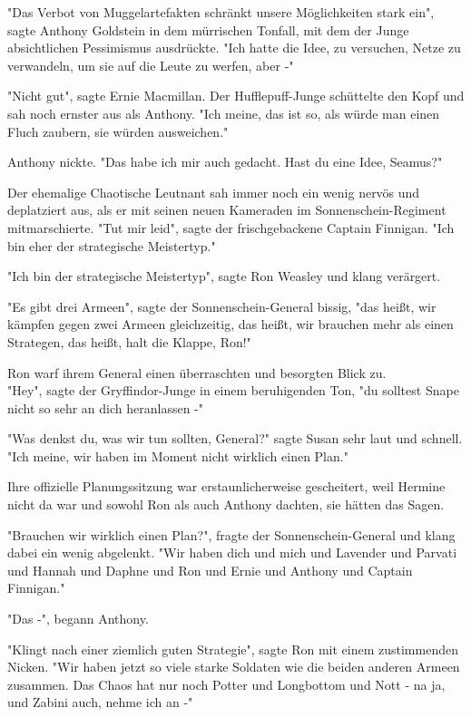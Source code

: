 {"Das Verbot von Muggelartefakten schränkt unsere Möglichkeiten stark ein", sagte Anthony Goldstein in dem mürrischen Tonfall, mit dem der Junge absichtlichen Pessimismus ausdrückte. "Ich hatte die Idee, zu versuchen, Netze zu verwandeln, um sie auf die Leute zu werfen, aber -"

"Nicht gut", sagte Ernie Macmillan. Der Hufflepuff-Junge schüttelte den Kopf und sah noch ernster aus als Anthony. "Ich meine, das ist so, als würde man einen Fluch zaubern, sie würden ausweichen."

Anthony nickte. "Das habe ich mir auch gedacht. Hast du eine Idee, Seamus?"

Der ehemalige Chaotische Leutnant sah immer noch ein wenig nervös und deplatziert aus, als er mit seinen neuen Kameraden im Sonnenschein-Regiment mitmarschierte. "Tut mir leid", sagte der frischgebackene Captain Finnigan. "Ich bin eher der strategische Meistertyp."

"Ich bin der strategische Meistertyp", sagte Ron Weasley und klang verärgert.

"Es gibt drei Armeen", sagte der Sonnenschein-General bissig, "das heißt, wir kämpfen gegen zwei Armeen gleichzeitig, das heißt, wir brauchen mehr als einen Strategen, das heißt, halt die Klappe, Ron!"

Ron warf ihrem General einen überraschten und besorgten Blick zu.\\ "Hey", sagte der Gryffindor-Junge in einem beruhigenden Ton, "du solltest Snape nicht so sehr an dich heranlassen -"

"Was denkst du, was wir tun sollten, General?" sagte Susan sehr laut und schnell. "Ich meine, wir haben im Moment nicht wirklich einen Plan."

Ihre offizielle Planungssitzung war erstaunlicherweise gescheitert, weil Hermine nicht da war und sowohl Ron als auch Anthony dachten, sie hätten das Sagen.

"Brauchen wir wirklich einen Plan?", fragte der Sonnenschein-General und klang dabei ein wenig abgelenkt. "Wir haben dich und mich und Lavender und Parvati und Hannah und Daphne und Ron und Ernie und Anthony und Captain Finnigan."

"Das -", begann Anthony.

"Klingt nach einer ziemlich guten Strategie", sagte Ron mit einem zustimmenden Nicken. "Wir haben jetzt so viele starke Soldaten wie die beiden anderen Armeen zusammen. Das Chaos hat nur noch Potter und Longbottom und Nott - na ja, und Zabini auch, nehme ich an -"

}

